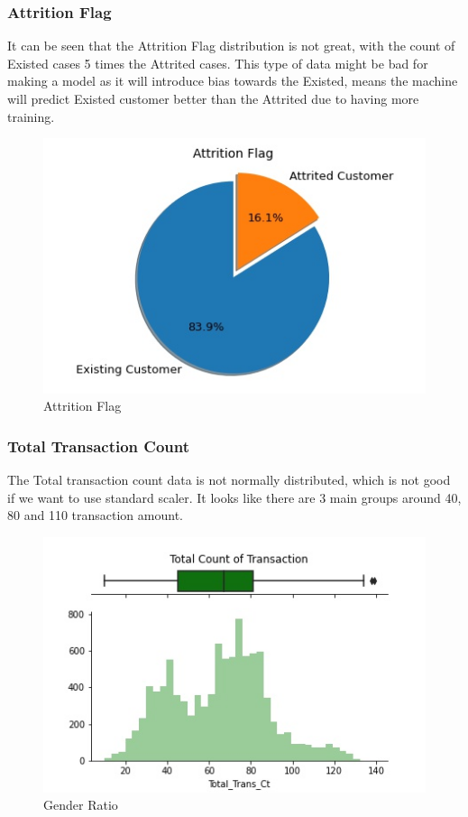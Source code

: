 \documentclass{homeworg}
\begin{document}
\subsubsection{Attrition Flag}
It can be seen that the Attrition Flag distribution is not great, with the count of Existed cases 5 times the Attrited cases. This type of data might be bad for making a model as it will introduce bias towards the Existed, means the machine will predict Existed customer better than the Attrited due to having more training.
\begin{figure}[H]
    \centering
    \includegraphics[scale=0.7]{figure/PC_Attrition.jpg}
    \caption{Attrition Flag}
    \label{fig:attrition}
\end{figure}
\par
\subsubsection{Total Transaction Count}
The Total transaction count data is not normally distributed, which is not good if we want to use standard scaler. 
It looks like there are 3 main groups around 40, 80 and 110 transaction amount.
\begin{figure}[H]
    \centering
    \includegraphics[scale=0.7]{figure/HG_Transaction_counts.jpg}
    \caption{Gender Ratio}
    \label{fig:transcount}
\end{figure}
\par
\end{document}
